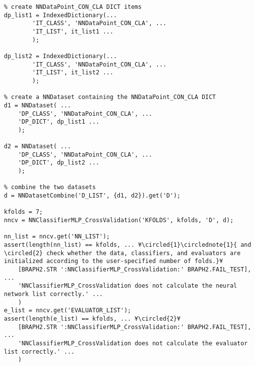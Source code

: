 \documentclass{tufte-handout}
\begin{document}
\begin{lstlisting}
% create NNDataPoint_CON_CLA DICT items
dp_list1 = IndexedDictionary(...
        'IT_CLASS', 'NNDataPoint_CON_CLA', ...
        'IT_LIST', it_list1 ...
        );

dp_list2 = IndexedDictionary(...
        'IT_CLASS', 'NNDataPoint_CON_CLA', ...
        'IT_LIST', it_list2 ...
        );

% create a NNDataset containing the NNDataPoint_CON_CLA DICT
d1 = NNDataset( ...
    'DP_CLASS', 'NNDataPoint_CON_CLA', ...
    'DP_DICT', dp_list1 ...
    );

d2 = NNDataset( ...
    'DP_CLASS', 'NNDataPoint_CON_CLA', ...
    'DP_DICT', dp_list2 ...
    );

% combine the two datasets
d = NNDatasetCombine('D_LIST', {d1, d2}).get('D');

kfolds = 7;
nncv = NNClassifierMLP_CrossValidation('KFOLDS', kfolds, 'D', d);

nn_list = nncv.get('NN_LIST');
assert(length(nn_list) == kfolds, ... ¥\circled{1}\circlednote{1}{ and \circled{2} check whether the data, classifiers, and evaluators are initialized according to the user-specified number of folds.}¥
    [BRAPH2.STR ':NNClassifierMLP_CrossValidation:' BRAPH2.FAIL_TEST], ...
    'NNClassifierMLP_CrossValidation does not calculate the neural network list correctly.' ...
    )
e_list = nncv.get('EVALUATOR_LIST');
assert(length(e_list) == kfolds, ... ¥\circled{2}¥
    [BRAPH2.STR ':NNClassifierMLP_CrossValidation:' BRAPH2.FAIL_TEST], ...
    'NNClassifierMLP_CrossValidation does not calculate the evaluator list correctly.' ...
    )

\end{lstlisting}
\end{document}
